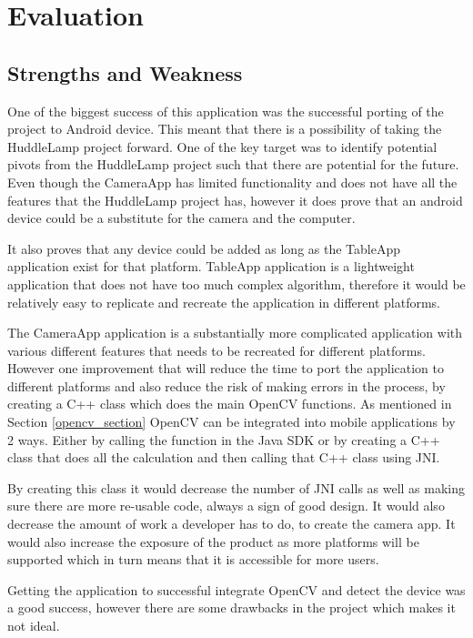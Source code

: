 \section{Evaluation}
\subsection{Strengths and Weakness}

One of the biggest success of this application was the successful porting of the project to Android device. This meant that there is a possibility of taking the HuddleLamp project forward. One of the key target was to identify potential pivots from the HuddleLamp project such that there are potential for the future. Even though the CameraApp has limited functionality and does not have all the features that the HuddleLamp project has, however it does prove that an android device could be a substitute for the camera and the computer.

It also proves that any device could be added as long as the TableApp application exist for that platform. TableApp application is a lightweight application that does not have too much complex algorithm, therefore it would be relatively easy to replicate and recreate the application in different platforms. 

The CameraApp application is a substantially more complicated application with various different features that needs to be recreated for different platforms. However one improvement that will reduce the time to port the application to different platforms and also reduce the risk of making errors in the process, by creating a C++ class which does the main OpenCV functions. As mentioned in Section \ref{opencv_section} OpenCV can be integrated into mobile applications by 2 ways. Either by calling the function in the Java SDK or by creating a C++ class that does all the calculation and then calling that C++ class using JNI.

By creating this class it would decrease the number of JNI calls as well as making sure there are more re-usable code, always a sign of good design. It would also decrease the amount of work a developer has to do, to create the camera app. It would also increase the exposure of the product as more platforms will be supported which in turn means that it is accessible for more users.

Getting the application to successful integrate OpenCV and detect the device was a good success, however there are some drawbacks in the project which makes it not ideal. 


